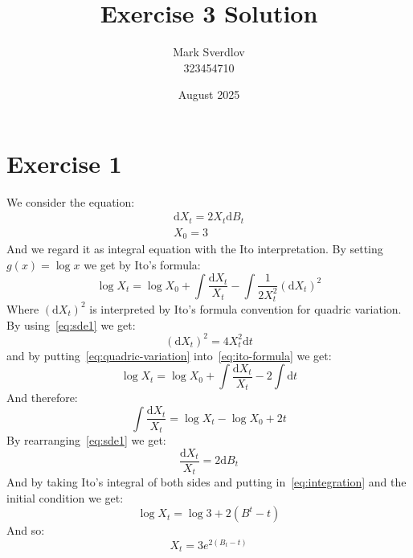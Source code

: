\documentclass{amsart}
\title{Exercise 3 Solution}
\author{Mark Sverdlov \\ 323454710}
\date{August 2025}
\theoremstyle{plain}
\theoremstyle{definition}
\theoremstyle{definition}
\theoremstyle{remark}
\newcommand{\diff}{\mathrm{d}}
\begin{document}
\maketitle
    \section{Exercise 1}
        We consider the equation:
        \begin{gather}
            \label{eq:sde1}
            \diff X_{t} = 2X_{t}\diff B_{t} \\
            X_{0} = 3
        \end{gather}
        And we regard it as integral equation with the Ito interpretation. By setting \(g \left(x\right) = \log x\) we get by Ito's formula:
        \begin{equation}
            \label{eq:ito-formula}
            \log X_{t} = \log X_{0} + \int \frac{\diff X_{t}}{X_{t}} - \int \frac{1}{2X_{t}^{2}} \left(\diff X_{t}\right)^{2}
        \end{equation}
        Where \(\left(\diff X_{t}\right)^{2}\) is interpreted by Ito's formula convention for quadric variation. By using~\eqref{eq:sde1} we get:
        \begin{equation}
            \label{eq:quadric-variation}
            \left(\diff X_{t}\right)^{2} = 4X_{t}^{2} \diff t
        \end{equation}
        and by putting~\eqref{eq:quadric-variation} into~\eqref{eq:ito-formula} we get:
        \begin{equation*}
           \log X_{t} = \log X_{0} + \int \frac{\diff X_{t}}{X_{t}} -2 \int \diff t
        \end{equation*}
        And therefore:
        \begin{equation}
            \label{eq:integration}
            \int \frac{\diff  X_{t}}{X_{t}} = \log X_{t} - \log X_{0} + 2t
        \end{equation}
        By rearranging~\eqref{eq:sde1} we get:
        \begin{equation*}
            \frac{\diff X_{t}}{X_{t}} = 2 \diff B_{t}
        \end{equation*}
        And by taking Ito's integral of both sides and putting in~\eqref{eq:integration} and the initial condition we get:
        \begin{equation*}
           \log X_{t} = \log 3 + 2 \left(B^{t}-t\right)
        \end{equation*}
        And so:
        \begin{equation*}
            X_{t} = 3 e^{2\left(B_{t}-t\right)}
        \end{equation*}
\end{document}
